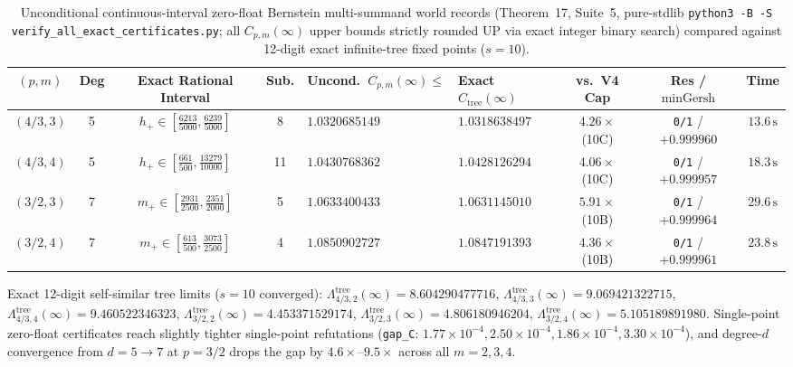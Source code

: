 \documentclass[10pt,letterpaper]{article}
\begin{document}
\begin{table}[htbp]
\centering
\caption{\small Unconditional continuous-interval zero-float Bernstein multi-summand world records (Theorem~17, Suite~5, pure-stdlib \texttt{python3 -B -S verify\_all\_exact\_certificates.py}; all $C_{p,m}(\infty)$ upper bounds strictly rounded UP via exact integer binary search) compared against 12-digit exact infinite-tree fixed points ($s = 10$).}
\vspace{3pt}
\footnotesize
\setlength{\tabcolsep}{3.1pt}
\begin{tabular}{@{}c c c c l l c c c@{}}
\toprule
\textbf{$(p, m)$} & \textbf{Deg} & \textbf{Exact Rational Interval} & \textbf{Sub.} & \textbf{Uncond.\ $C_{p,m}(\infty) \le$} & \textbf{Exact $C_{\mathrm{tree}}(\infty)$} & \textbf{vs.\ V4 Cap} & \textbf{Res / $\min\text{Gersh}$} & \textbf{Time} \\
\midrule
$(4/3, 3)$ & 5 & $h_+ \in [\tfrac{6213}{5000}, \tfrac{6239}{5000}]$ & 8  & $\mathbf{1.0320685149}$ & $1.0318638497$ & $\mathbf{4.26\times}$ (10C) & \texttt{0/1} / $+0.999960$ & $13.6\,\mathrm{s}$ \\
$(4/3, 4)$ & 5 & $h_+ \in [\tfrac{661}{500}, \tfrac{13279}{10000}]$ & 11 & $\mathbf{1.0430768362}$ & $1.0428126294$ & $\mathbf{4.06\times}$ (10C) & \texttt{0/1} / $+0.999957$ & $18.3\,\mathrm{s}$ \\
$(3/2, 3)$ & 7 & $m_+ \in [\tfrac{2931}{2500}, \tfrac{2351}{2000}]$ & 5  & $\mathbf{1.0633400433}$ & $1.0631145010$ & $\mathbf{5.91\times}$ (10B) & \texttt{0/1} / $+0.999964$ & $29.6\,\mathrm{s}$ \\
$(3/2, 4)$ & 7 & $m_+ \in [\tfrac{613}{500}, \tfrac{3073}{2500}]$   & 4  & $\mathbf{1.0850902727}$ & $1.0847191393$ & $\mathbf{4.36\times}$ (10B) & \texttt{0/1} / $+0.999961$ & $23.8\,\mathrm{s}$ \\
\bottomrule
\end{tabular}
\vspace{3.5pt}
\par\parbox{0.96\textwidth}{\footnotesize Exact 12-digit self-similar tree limits ($s = 10$ converged): $\Lambda_{4/3,2}^{\mathrm{tree}}(\infty) = 8.604290477716$, $\Lambda_{4/3,3}^{\mathrm{tree}}(\infty) = 9.069421322715$, $\Lambda_{4/3,4}^{\mathrm{tree}}(\infty) = 9.460522346323$, $\Lambda_{3/2,2}^{\mathrm{tree}}(\infty) = 4.453371529174$, $\Lambda_{3/2,3}^{\mathrm{tree}}(\infty) = 4.806180946204$, $\Lambda_{3/2,4}^{\mathrm{tree}}(\infty) = 5.105189891980$. Single-point zero-float certificates reach slightly tighter single-point refutations (\texttt{gap\_C}: $1.77\times 10^{-4}, 2.50\times 10^{-4}, 1.86\times 10^{-4}, 3.30\times 10^{-4}$), and degree-$d$ convergence from $d = 5 \to 7$ at $p = 3/2$ drops the gap by $4.6\times$--$9.5\times$ across all $m = 2, 3, 4$.}
\label{tab:multisummand}
\end{table}
\end{document}
